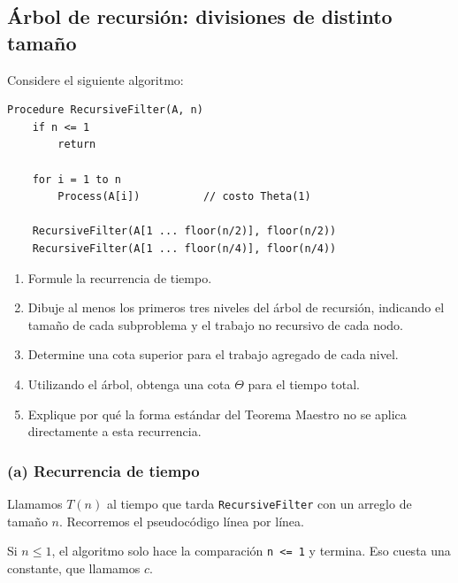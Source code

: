 \subsection{Árbol de recursión: divisiones de distinto tamaño}
\label{sec:act3-1}

\begin{enunciado}
Considere el siguiente algoritmo:
\begin{lstlisting}[language={}, numbers=none, frame=none, backgroundcolor={}]
Procedure RecursiveFilter(A, n)
    if n <= 1
        return

    for i = 1 to n
        Process(A[i])          // costo Theta(1)

    RecursiveFilter(A[1 ... floor(n/2)], floor(n/2))
    RecursiveFilter(A[1 ... floor(n/4)], floor(n/4))
\end{lstlisting}
\begin{enumerate}[label=(\alph*)]
  \item Formule la recurrencia de tiempo.
  \item Dibuje al menos los primeros tres niveles del árbol de recursión, indicando el
        tamaño de cada subproblema y el trabajo no recursivo de cada nodo.
  \item Determine una cota superior para el trabajo agregado de cada nivel.
  \item Utilizando el árbol, obtenga una cota $\Theta$ para el tiempo total.
  \item Explique por qué la forma estándar del Teorema Maestro no se aplica directamente a
        esta recurrencia.
\end{enumerate}
\end{enunciado}

\subsubsection*{(a) Recurrencia de tiempo}

Llamamos $T(n)$ al tiempo que tarda \texttt{RecursiveFilter} con un arreglo de tamaño
$n$. Recorremos el pseudocódigo línea por línea.

Si $n \le 1$, el algoritmo solo hace la comparación \texttt{n <= 1} y termina. Eso cuesta
una constante, que llamamos $c$.

